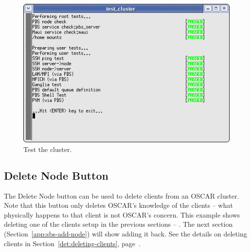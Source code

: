 \begin{figure}[h!]
  \begin{center}
    \centerline{
      \includegraphics[scale=\imgscale]{figs/8_test-cluster-complete}
      }
    \caption{Test the cluster.}
    \label{fig:sbs-setup-test}
  \end{center}
\end{figure}



\subsection{Delete Node Button}
\label{app:sbs-delete-node}

The Delete Node button can be used to delete clients from an OSCAR
cluster.  Note that this button only deletes OSCAR's knowledge of the
clients -- what physically happens to that client is not OSCAR's
concern.  This example shows deleting one of the clients setup in the
previous sections -- .  The next section
(Section~\ref{app:sbs-add-node}) will show adding it back.  See the
details on deleting clients in Section~\ref{det:deleting-clients},
page~\pageref{det:deleting-clients}.

